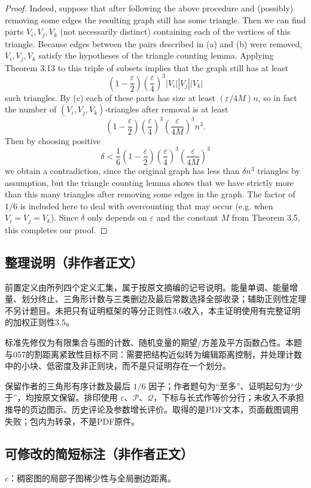 \documentclass[UTF8,11pt]{ctexart}
\theoremstyle{definition}
\begin{document}
\begin{proof}
Indeed, suppose that after following the above procedure and (possibly) removing some edges the resulting graph still has some triangle. Then we can find parts $V_i,V_j,V_k$ (not necessarily distinct) containing each of the vertices of this triangle. Because edges between the pairs described in (a) and (b) were removed, $V_i,V_j,V_k$ satisfy the hypotheses of the triangle counting lemma. Applying Theorem 3.13 to this triple of subsets implies that the graph still has at least
\[\left(1-\frac{\varepsilon}{2}\right)\left(\frac{\varepsilon}{4}\right)^3|V_i||V_j||V_k|\]
such triangles. By (c) each of these parts has size at least $(\varepsilon/4M)n$, so in fact the number of $(V_i,V_j,V_k)$-triangles after removal is at least
\[\left(1-\frac{\varepsilon}{2}\right)\left(\frac{\varepsilon}{4}\right)^3\left(\frac{\varepsilon}{4M}\right)^3n^3.\]
Then by choosing positive
\[\delta<\frac16\left(1-\frac{\varepsilon}{2}\right)\left(\frac{\varepsilon}{4}\right)^3\left(\frac{\varepsilon}{4M}\right)^3\]
we obtain a contradiction, since the original graph has less than $\delta n^3$ triangles by assumption, but the triangle counting lemma shows that we have strictly more than this many triangles after removing some edges in the graph. The factor of $1/6$ is included here to deal with overcounting that may occur (e.g. when $V_i=V_j=V_k$). Since $\delta$ only depends on $\varepsilon$ and the constant $M$ from Theorem 3.5, this completes our proof.
\end{proof}
\subsection*{整理说明（非作者正文）}
前置定义由所列四个定义汇集，属于按原文摘编的记号说明。能量单调、能量增量、划分终止、三角形计数与三类删边及最后常数选择全部收录；辅助正则性定理不另计题目。未把只有证明框架的等分正则性3.6收入，本主证明使用有完整证明的加权正则性3.5。

标准先修仅为有限集合与图的计数、随机变量的期望/方差及平方函数凸性。本题与057的割距离紧致性目标不同：需要把结构近似转为编辑距离控制，并处理计数中的小块、低密度及非正则块，而不是只证明存在一个划分。

保留作者的三角形有序计数及最后 $1/6$ 因子；作者题句为“至多”、证明起句为“少于”，均按原文保留。排印使用 $\varepsilon$、$\mathcal P$、$\mathcal Q$，下标与长式作等价分行；未收入不承担推导的页边图示、历史评论及参数增长评价。取得的是PDF文本，页面截图调用失败；包内为转录，不是PDF原件。
\subsection*{可修改的简短标注（非作者正文）}
$c$：稠密图的局部子图稀少性与全局删边距离。
\end{document}
